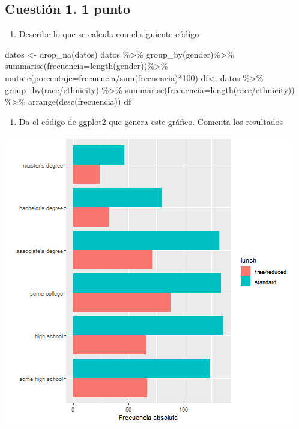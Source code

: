 \documentclass[
]{article}
\newenvironment{Shaded}{\begin{snugshade}}{\end{snugshade}}
\newcommand{\AttributeTok}[1]{\textcolor[rgb]{0.77,0.63,0.00}{#1}}
\newcommand{\DecValTok}[1]{\textcolor[rgb]{0.00,0.00,0.81}{#1}}
\newcommand{\FunctionTok}[1]{\textcolor[rgb]{0.00,0.00,0.00}{#1}}
\newcommand{\NormalTok}[1]{#1}
\newcommand{\OtherTok}[1]{\textcolor[rgb]{0.56,0.35,0.01}{#1}}
\newcommand{\SpecialCharTok}[1]{\textcolor[rgb]{0.00,0.00,0.00}{#1}}
\newcommand{\StringTok}[1]{\textcolor[rgb]{0.31,0.60,0.02}{#1}}
\providecommand{\tightlist}{%
  \setlength{\itemsep}{0pt}\setlength{\parskip}{0pt}}
\begin{document}
\hypertarget{cuestiuxf3n-1.-1-punto}{%
\subsection{\texorpdfstring{Cuestión 1. \textbf{1
punto}}{Cuestión 1. 1 punto}}\label{cuestiuxf3n-1.-1-punto}}

\begin{enumerate}
\def\labelenumi{\alph{enumi}.}
\tightlist
\item
  Describe lo que se calcula con el siguiente código
\end{enumerate}

\begin{Shaded}
\begin{Highlighting}[]
\NormalTok{datos }\OtherTok{\textless{}{-}} \FunctionTok{drop\_na}\NormalTok{(datos)}
\NormalTok{datos }\SpecialCharTok{\%\textgreater{}\%} \FunctionTok{group\_by}\NormalTok{(gender)}\SpecialCharTok{\%\textgreater{}\%}
  \FunctionTok{summarise}\NormalTok{(}\AttributeTok{frecuencia=}\FunctionTok{length}\NormalTok{(gender))}\SpecialCharTok{\%\textgreater{}\%}
  \FunctionTok{mutate}\NormalTok{(}\AttributeTok{porcentaje=}\NormalTok{frecuencia}\SpecialCharTok{/}\FunctionTok{sum}\NormalTok{(frecuencia)}\SpecialCharTok{*}\DecValTok{100}\NormalTok{)}
\NormalTok{df}\OtherTok{\textless{}{-}}\NormalTok{ datos }\SpecialCharTok{\%\textgreater{}\%} \FunctionTok{group\_by}\NormalTok{(}\StringTok{\textasciigrave{}}\AttributeTok{race/ethnicity}\StringTok{\textasciigrave{}}\NormalTok{) }\SpecialCharTok{\%\textgreater{}\%}
 \FunctionTok{summarise}\NormalTok{(}\AttributeTok{frecuencia=}\FunctionTok{length}\NormalTok{(}\StringTok{\textasciigrave{}}\AttributeTok{race/ethnicity}\StringTok{\textasciigrave{}}\NormalTok{)) }\SpecialCharTok{\%\textgreater{}\%}
 \FunctionTok{arrange}\NormalTok{(}\FunctionTok{desc}\NormalTok{(frecuencia)) }
\NormalTok{df}
\end{Highlighting}
\end{Shaded}

\begin{enumerate}
\def\labelenumi{\alph{enumi}.}
\setcounter{enumi}{1}
\tightlist
\item
  Da el código de ggplot2 que genera este gráfico. Comenta los
  resultados
\end{enumerate}

\begin{center}\includegraphics[width=0.6\linewidth]{plot1} \end{center}
\end{document}
